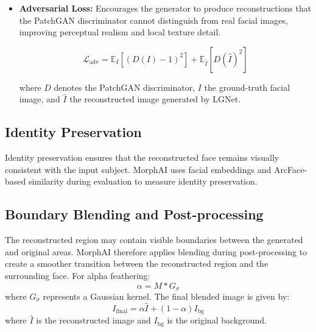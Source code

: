 \begin{itemize}
    \item \textbf{Adversarial Loss:} Encourages the generator to produce
reconstructions that the PatchGAN discriminator cannot distinguish from
real facial images, improving perceptual realism and local texture detail.


\begin{equation}
\mathcal{L}_{\text{adv}} = \mathbb{E}_{I}\left[(D(I) - 1)^2\right] +
\mathbb{E}_{\hat{I}}\left[D(\hat{I})^2\right]
\label{eq:adv-loss}
\end{equation}

where $D$ denotes the PatchGAN discriminator, $I$ the ground-truth facial
image, and $\hat{I}$ the reconstructed image generated by LGNet.

\end{itemize}

\subsection{Identity Preservation}

Identity preservation ensures that the reconstructed face remains visually
consistent with the input subject. MorphAI uses facial embeddings and
ArcFace-based similarity during evaluation to measure identity preservation.

\subsection{Boundary Blending and Post-processing}
The reconstructed region may contain visible boundaries between the generated
and original areas. MorphAI therefore applies blending during post-processing
to create a smoother transition between the reconstructed region and the
surrounding face.
\noindent For alpha feathering:
\begin{equation}
\alpha = M * G_{\sigma}
\end{equation}
\noindent where $G_{\sigma}$ represents a Gaussian kernel. The final blended image is
given by:
\begin{equation}
I_{\text{final}}
=
\alpha\hat{I}
+
(1-\alpha)I_{\text{bg}}
\end{equation}
\noindent where $\hat{I}$ is the reconstructed image and $I_{\text{bg}}$ is the original
background.

